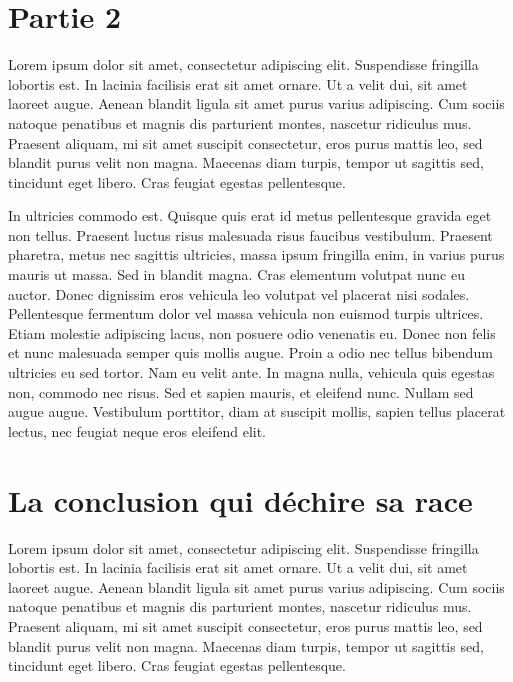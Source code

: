 \documentclass[a4paper,12pt]{report}
\begin{document}
\chapter{Partie 2}
Lorem ipsum dolor sit amet, consectetur adipiscing elit. Suspendisse
fringilla lobortis est. In lacinia facilisis erat sit amet ornare. Ut
a velit dui, sit amet laoreet augue. Aenean blandit ligula sit amet
purus varius adipiscing. Cum sociis natoque penatibus et magnis dis
parturient montes, nascetur ridiculus mus. Praesent aliquam, mi sit
amet suscipit consectetur, eros purus mattis leo, sed blandit purus
velit non magna. Maecenas diam turpis, tempor ut sagittis sed,
tincidunt eget libero. Cras feugiat egestas pellentesque.

In ultricies commodo est. Quisque quis erat id metus pellentesque
gravida eget non tellus. Praesent luctus risus malesuada risus
faucibus vestibulum. Praesent pharetra, metus nec sagittis ultricies,
massa ipsum fringilla enim, in varius purus mauris ut massa. Sed in
blandit magna. Cras elementum volutpat nunc eu auctor. Donec dignissim
eros vehicula leo volutpat vel placerat nisi sodales. Pellentesque
fermentum dolor vel massa vehicula non euismod turpis ultrices. Etiam
molestie adipiscing lacus, non posuere odio venenatis eu. Donec non
felis et nunc malesuada semper quis mollis augue. Proin a odio nec
tellus bibendum ultricies eu sed tortor. Nam eu velit ante. In magna
nulla, vehicula quis egestas non, commodo nec risus. Sed et sapien
mauris, et eleifend nunc. Nullam sed augue augue. Vestibulum
porttitor, diam at suscipit mollis, sapien tellus placerat lectus, nec
feugiat neque eros eleifend elit.

\chapter[Conclusion]{La conclusion qui déchire sa race}
Lorem ipsum dolor sit amet, consectetur adipiscing elit. Suspendisse
fringilla lobortis est. In lacinia facilisis erat sit amet ornare. Ut
a velit dui, sit amet laoreet augue. Aenean blandit ligula sit amet
purus varius adipiscing. Cum sociis natoque penatibus et magnis dis
parturient montes, nascetur ridiculus mus. Praesent aliquam, mi sit
amet suscipit consectetur, eros purus mattis leo, sed blandit purus
velit non magna. Maecenas diam turpis, tempor ut sagittis sed,
tincidunt eget libero. Cras feugiat egestas pellentesque.
\end{document}
